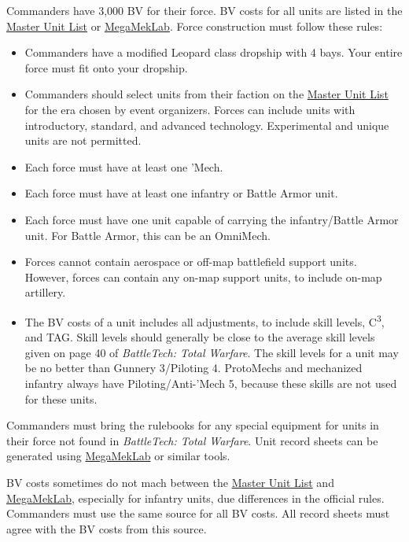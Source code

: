 Commanders have 3,000 BV for their force.
BV costs for all units are listed in the \href{http://www.masterunitlist.info}{Master Unit List} or \href{https://megamek.org}{MegaMekLab}.
Force construction must follow these rules:

\begin{itemize}

\item Commanders have a modified Leopard class dropship with 4 bays.
Your entire force must fit onto your dropship.

\item Commanders should select units from their faction on the \href{http://www.masterunitlist.info/}{Master Unit List} for the era chosen by event organizers.
Forces can include units with introductory, standard, and advanced technology.
Experimental and unique units are not permitted.

\item Each force must have at least one 'Mech.

\item Each force must have at least one infantry or Battle Armor unit.

\item Each force must have one unit capable of carrying the infantry/Battle Armor unit.
For Battle Armor, this can be an OmniMech.

\item Forces cannot contain aerospace or off-map battlefield support units.
However, forces can contain any on-map support units, to include on-map artillery.

\item The BV costs of a unit includes all adjustments, to include skill levels, C\textsuperscript{3}, and TAG.
Skill levels should generally be close to the average skill levels given on page 40 of \emph{BattleTech: Total Warfare}.
The skill levels for a unit may be no better than Gunnery 3/Piloting 4.
ProtoMechs and mechanized infantry always have Piloting/Anti-'Mech 5, because these skills are not used for these units.

\end{itemize}

Commanders must bring the rulebooks for any special equipment for units in their force not found in \emph{BattleTech: Total Warfare}.
Unit record sheets can be generated using \href{https://megamek.org}{MegaMekLab} or similar tools.

BV costs sometimes do not mach between the \href{http://www.masterunitlist.info}{Master Unit List} and \href{https://megamek.org}{MegaMekLab}, especially for infantry units, due differences in the official rules.
Commanders must use the same source for all BV costs.
All record sheets must agree with the BV costs from this source.

